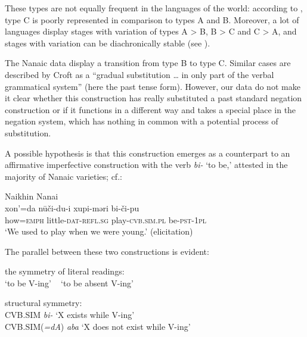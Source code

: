 \documentclass[output=paper]{langscibook}
\begin{document}

These types are not equally frequent in the languages of the world: according to \citet[147]{Veselinova2016}, type C is poorly represented in comparison to types A and B. Moreover, a lot of languages display stages with variation of types A > B, B > C and C > A, and stages with variation can be diachronically stable (see \citealp[158]{Veselinova2016}).

The Nanaic data display a transition from type B to type C. Similar cases are described by Croft as a ``gradual substitution … in only part of the verbal grammatical system” \citeyearpar[10]{Croft1991} (here the past tense form). However, our data do not make it clear whether this construction has really substituted a past standard negation construction or if it functions in a different way and takes a special place in the negation system, which has nothing in common with a potential process of substitution.

A possible hypothesis is that this construction emerges as a counterpart to an affirmative imperfective construction with the verb \textit{bi-} ‘to be,’ attested in the majority of Nanaic varieties; cf.:

\ea Naikhin Nanai \label{ex:T18}\\
	\gll xon’=da	nūči-du-i	xupi-məri	bi-či-pu\\
	how=\textsc{emph}	little-\textsc{dat-refl.sg}	play-\textsc{cvb.sim.pl}	be-\textsc{pst-1pl}\\
	\glt `We used to play when we were young.' (elicitation)
\z

The parallel between these two constructions is evident:

\begin{exe}\label{ex:T19}
    \ex the symmetry of literal readings:\\
    `to be V-ing' ~ `to be absent V-ing' 
\end{exe}

\begin{exe}\label{ex:T20}
    \ex structural symmetry:\\
    CVB.SIM \textit{bi-} `X exists while V-ing'\\
    CVB.SIM(\textit{=dA}) \textit{aba} `X does not exist while V-ing'
\end{exe}
\end{document}
